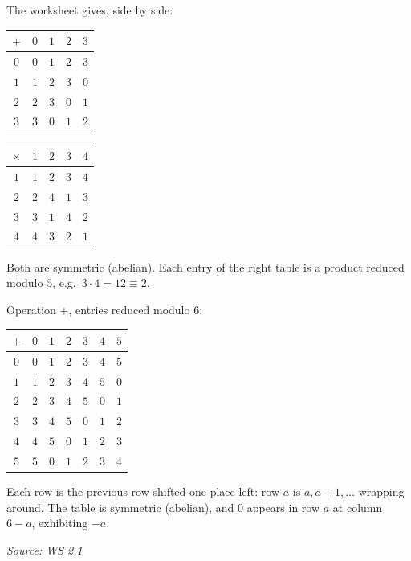 \documentclass[11pt]{report}
\newcommand{\srcline}[1]{\par\hfill{\footnotesize\textit{Source: #1}}}
\begin{document}
\begin{exbox}\label{ex:tables-z-4z-u5}
The worksheet gives, side by side:
\begin{center}
\begin{tabular}{c|cccc}
$+$ & $0$ & $1$ & $2$ & $3$ \\ \hline
$0$ & $0$ & $1$ & $2$ & $3$ \\
$1$ & $1$ & $2$ & $3$ & $0$ \\
$2$ & $2$ & $3$ & $0$ & $1$ \\
$3$ & $3$ & $0$ & $1$ & $2$
\end{tabular}
\qquad\qquad
\begin{tabular}{c|cccc}
$\times$ & $1$ & $2$ & $3$ & $4$ \\ \hline
$1$ & $1$ & $2$ & $3$ & $4$ \\
$2$ & $2$ & $4$ & $1$ & $3$ \\
$3$ & $3$ & $1$ & $4$ & $2$ \\
$4$ & $4$ & $3$ & $2$ & $1$
\end{tabular}
\end{center}
Both are symmetric (abelian). Each entry of the right table is a product reduced modulo $5$, e.g.\ $3 \cdot 4 = 12 \equiv 2$.
\end{exbox}

\begin{exbox}\label{ex:table-z-6z}
Operation $+$, entries reduced modulo $6$:
\begin{center}
\begin{tabular}{c|cccccc}
$+$ & $0$ & $1$ & $2$ & $3$ & $4$ & $5$ \\ \hline
$0$ & $0$ & $1$ & $2$ & $3$ & $4$ & $5$ \\
$1$ & $1$ & $2$ & $3$ & $4$ & $5$ & $0$ \\
$2$ & $2$ & $3$ & $4$ & $5$ & $0$ & $1$ \\
$3$ & $3$ & $4$ & $5$ & $0$ & $1$ & $2$ \\
$4$ & $4$ & $5$ & $0$ & $1$ & $2$ & $3$ \\
$5$ & $5$ & $0$ & $1$ & $2$ & $3$ & $4$
\end{tabular}
\end{center}
Each row is the previous row shifted one place left: row $a$ is $a, a+1, \ldots$ wrapping around. The table is symmetric (abelian), and $0$ appears in row $a$ at column $6 - a$, exhibiting $-a$.
\srcline{WS 2.1}
\end{exbox}
\end{document}
